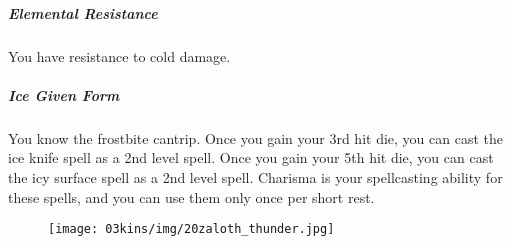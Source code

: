 \subparagraph{Elemental Resistance} You have resistance to cold damage.

\subparagraph{Ice Given Form} You know the frostbite cantrip.
Once you gain your 3rd hit die, you can cast the ice knife spell as a 2nd level spell.
Once you gain your 5th hit die, you can cast the icy surface spell as a 2nd level spell.
Charisma is your spellcasting ability for these spells, and you can use them only once per short rest.

\begin{figure}[!b]
    \centering
    \texttt{[image: 03kins/img/20zaloth\_thunder.jpg]}
\end{figure}



\newpage
